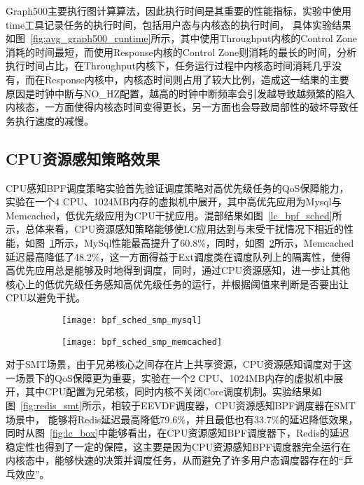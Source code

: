Graph500主要执行图计算算法，因此执行时间是其重要的性能指标，实验中使用time工具记录任务的执行时间，包括用户态与内核态的执行时间， 具体实验结果如图~\ref{fig:avg_graph500_runtime}所示，其中使用Throughput内核的Control Zone消耗的时间最短，而使用Response内核的Control Zone则消耗的最长的时间，分析执行时间占比，在Throughput内核下，任务运行过程中内核态时间消耗几乎没有，而在Response内核中，内核态时间则占用了较大比例，造成这一结果的主要原因是时钟中断与NO\_HZ配置，越高的时钟中断频率会引发越导致越频繁的陷入内核态，一方面使得内核态时间变得更长，另一方面也会导致局部性的破坏导致任务执行速度的减慢。

\subsection{CPU资源感知策略效果}


CPU感知BPF调度策略实验首先验证调度策略对高优先级任务的QoS保障能力，实验在一个4 CPU、1024MB内存的虚拟机中展开，其中高优先应用为Mysql与Memcached，低优先级应用为CPU干扰应用。混部结果如图~\ref{lc_bpf_sched}所示，总体来看，CPU资源感知策略能够使LC应用达到与未受干扰情况下相近的性能，如图~\ref{fig:bpf_sched_smp_mysql}所示，MySql性能最高提升了60.8\%，同时，如图~\ref{fig:bpf_sched_smp_memcached}所示，Memcached延迟最高降低了48.2\%，这一方面得益于Ext调度类在调度队列上的隔离性，使得高优先应用总是能够及时地得到调度，同时，通过CPU资源感知，进一步让其他核心上的低优先级任务感知高优先级任务的运行，并根据阈值来判断是否要出让CPU以避免干扰。

\begin{figure}[H]
    \centering
    \begin{subfigure}[b]{0.49\textwidth}
        \texttt{[image: bpf\_sched\_smp\_mysql]}
        \label{fig:bpf_sched_smp_mysql}
    \end{subfigure}
    \begin{subfigure}[b]{0.49\textwidth}
        \texttt{[image: bpf\_sched\_smp\_memcached]}
        \label{fig:bpf_sched_smp_memcached}
    \end{subfigure}
\label{fig:lc_bpf_sched}
\end{figure}

对于SMT场景，由于兄弟核心之间存在片上共享资源，CPU资源感知调度对于这一场景下的QoS保障更为重要，实验在一个2 CPU、1024MB内存的虚拟机中展开，其中CPU配置为兄弟核，同时内核不关闭Core调度机制。实验结果如图~\ref{fig:redis_smt}所示，相较于EEVDF调度器，CPU资源感知BPF调度器在SMT场景中， 能够将Redis延迟最高降低79.6\%，并且最低也有33.7\%的延迟降低效果，同时从图~\ref{fig:lc_box}中能够看出，在CPU资源感知BPF调度器下，Redis的延迟稳定性也得到了一定的保障，这主要是因为CPU资源感知BPF调度器完全运行在内核态中，能够快速的决策并调度任务，从而避免了许多用户态调度器存在的“乒乓效应”。


